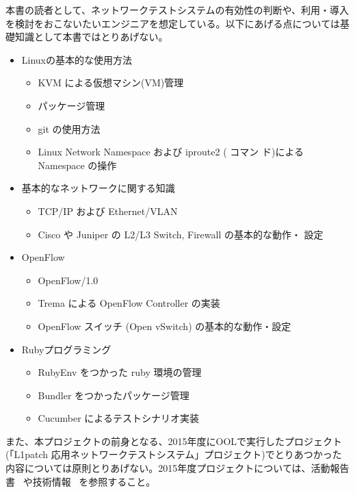 本書の読者として、ネットワークテストシステムの有効性の判断や、利用・導入
を検討をおこないたいエンジニアを想定している。以下にあげる点については基
礎知識として本書ではとりあげない。

\begin{itemize}
 \item Linuxの基本的な使用方法
       \begin{itemize}
        \item KVM による仮想マシン(VM)管理
        \item パッケージ管理
        \item git の使用方法
        \item Linux Network Namespace および iproute2 (  コマン
              ド)によるNamespace の操作
       \end{itemize}
 \item 基本的なネットワークに関する知識
       \begin{itemize}
        \item TCP/IP および Ethernet/VLAN
        \item Cisco や Juniper の L2/L3 Switch, Firewall の基本的な動作・
              設定
       \end{itemize}
 \item OpenFlow
       \begin{itemize}
        \item OpenFlow/1.0
        \item Trema による OpenFlow Controller の実装
        \item OpenFlow スイッチ (Open vSwitch) の基本的な動作・設定
       \end{itemize}
 \item Rubyプログラミング
       \begin{itemize}
        \item RubyEnv をつかった ruby 環境の管理
        \item Bundler をつかったパッケージ管理
        \item Cucumber によるテストシナリオ実装
       \end{itemize}
\end{itemize}

また、本プロジェクトの前身となる、2015年度にOOLで実行したプロジェクト
(「L1patch 応用ネットワークテストシステム」プロジェクト)でとりあつかった
内容については原則とりあげない。2015年度プロジェクトについては、活動報告
書~\cite{l1pjpoc} や技術情報~\cite{l1pjtech} を参照すること。

